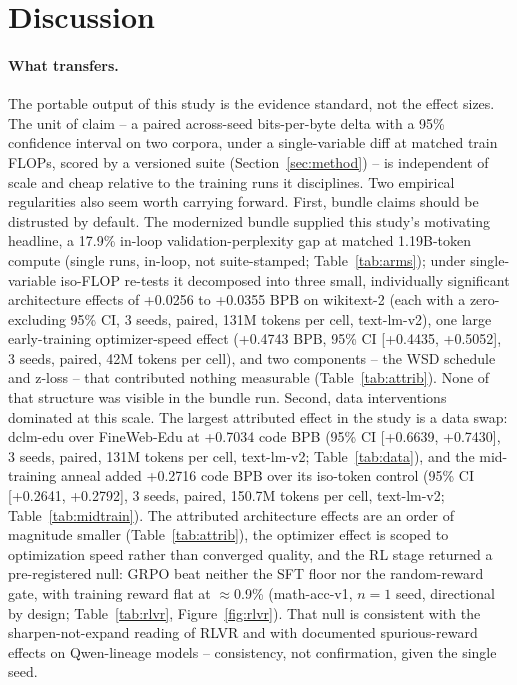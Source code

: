\section{Discussion}\label{sec:discussion}

\paragraph{What transfers.}
The portable output of this study is the evidence standard, not the effect
sizes. The unit of claim -- a paired across-seed bits-per-byte delta with a
95\% confidence interval on two corpora, under a single-variable diff at
matched train FLOPs, scored by a versioned suite (Section~\ref{sec:method})
-- is independent of scale and cheap relative to the training runs it
disciplines. Two empirical regularities also seem worth carrying forward.
First, bundle claims should be distrusted by default. The modernized bundle
\citep{grigorev2026imu} supplied this study's motivating headline, a 17.9\%
in-loop validation-perplexity gap at matched 1.19B-token compute (single
runs, in-loop, not suite-stamped; Table~\ref{tab:arms}); under
single-variable iso-FLOP re-tests it decomposed into three small,
individually significant architecture effects of +0.0256 to +0.0355 BPB on
wikitext-2 (each with a zero-excluding 95\% CI, 3 seeds, paired, 131M
tokens per cell, text-lm-v2), one large early-training optimizer-speed
effect (+0.4743 BPB, 95\% CI [+0.4435, +0.5052], 3 seeds, paired, 42M
tokens per cell), and two components -- the WSD schedule and z-loss -- that
contributed nothing measurable (Table~\ref{tab:attrib}). None of that
structure was visible in the bundle run. Second, data interventions
dominated at this scale. The largest attributed effect in the study is a
data swap: dclm-edu over FineWeb-Edu at +0.7034 code BPB (95\% CI
[+0.6639, +0.7430], 3 seeds, paired, 131M tokens per cell, text-lm-v2;
Table~\ref{tab:data}), and the mid-training anneal added +0.2716 code BPB
over its iso-token control (95\% CI [+0.2641, +0.2792], 3 seeds, paired,
150.7M tokens per cell, text-lm-v2; Table~\ref{tab:midtrain}). The
attributed architecture effects are an order of magnitude smaller
(Table~\ref{tab:attrib}), the optimizer effect is scoped to optimization
speed rather than converged quality, and the RL stage returned a
pre-registered null: GRPO beat neither the SFT floor nor the random-reward
gate, with training reward flat at $\approx$0.9\% (math-acc-v1, $n{=}1$
seed, directional by design; Table~\ref{tab:rlvr}, Figure~\ref{fig:rlvr}).
That null is consistent with the sharpen-not-expand reading of RLVR and
with documented spurious-reward effects on Qwen-lineage models
\citep{yue2025does, shao2025spurious} -- consistency, not confirmation,
given the single seed.

